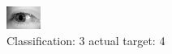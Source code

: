 \begin{figure}[h!]
\begin{center}
\includegraphics[width=0.60\columnwidth]{figures/ID3215_class_3_target_4.png}
\end{center}
\caption{ Classification: 3 actual target: 4}
\label{fig:ID3215_class_3_target_4}
\end{figure}
